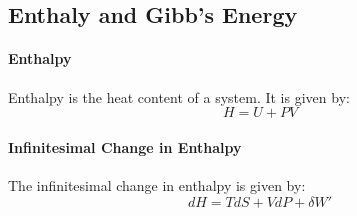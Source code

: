 \documentclass[11pt]{article}
\begin{document}
\subsection{Enthaly and Gibb's Energy}
\paragraph{Enthalpy} Enthalpy is the heat content of a system. It is given by:
\begin{equation}
    H = U + PV
\end{equation}
\paragraph{Infinitesimal Change in Enthalpy} The infinitesimal change in enthalpy is given by:
\begin{equation}
    dH = TdS + VdP + \delta W'
\end{equation}
\end{document}
